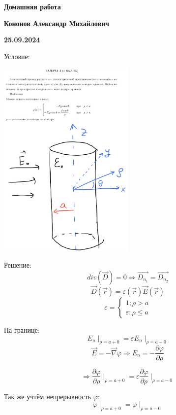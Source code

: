 \documentclass[12pt]{article}
\begin{document}
\begin{large}
\begin{center}
\LARGE \textbf{Домашняя работа}
\par
\LARGE \textbf{Кононов Александр Михайлович}
\par
    \textbf{25.09.2024}
\end{center}
\par Условие:
\par
\includegraphics[width=0.5\textwidth]{photo.png}
\par Решение:
\[
    div\left( \overrightarrow{D} \right) = 0 \Rightarrow \overrightarrow{D_{n_1}} = \overrightarrow{D_{n_2}}
\]
\[
    \overrightarrow{D}(\vec{r})=\varepsilon(\vec{r}) \overrightarrow{E}(\vec{r})
\]
\[
    \varepsilon =
    \begin{cases}
        1 ; \rho > a
        \\
        \varepsilon ; \rho \leq a
    \end{cases}
\]
\par На границе:
\[
    E_n\mid_{\rho = a+0} = \varepsilon  E_n\mid_{\rho = a-0}
\]
\[
    \overrightarrow{E} = - \overrightarrow{\nabla} \varphi \Rightarrow E_n = -\frac{\partial \varphi}{\partial \rho}
\]
\par
\[
    \Rightarrow \frac{\partial \varphi}{\partial \rho}\mid_{\rho = a+0} = \varepsilon \frac{\partial \varphi}{\partial \rho}\mid_{\rho = a-0}
\]
\par Так же учтём непрерывность $\varphi$:
\[
    \varphi \mid_{\rho = a+0} =  \varphi \mid_{\rho = a-0}
\]
\end{large}
\end{document}
